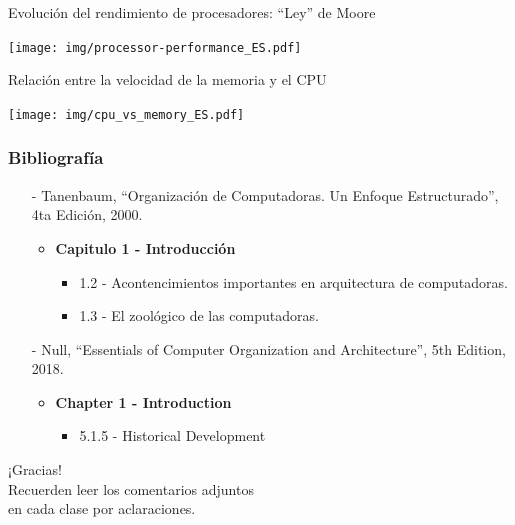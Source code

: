 \documentclass[aspectratio=169]{beamer}
\begin{document}
\begin{frame}[fragile,t]{Evolución del rendimiento de procesadores: ``Ley'' de Moore}
    \begin{center}
    \texttt{[image: img/processor-performance\_ES.pdf]}
    \end{center}
\end{frame}

\begin{frame}[fragile,t]{Relación entre la velocidad de la memoria y el CPU}
    \begin{center}
    \texttt{[image: img/cpu\_vs\_memory\_ES.pdf]}
    \end{center}
\end{frame}

\begin{frame}[fragile]
    \frametitle{Bibliografía}
    \begin{itemize}
     \setlength\itemsep{0.5cm}
    \item[-] \small Tanenbaum, “Organización de Computadoras. Un Enfoque Estructurado”, 4ta Edición, 2000.\\
    \begin{itemize}
     \item \textbf{Capitulo 1 - Introducción}\\
     \begin{itemize}
      \item 1.2 - Acontencimientos importantes en arquitectura de computadoras.
      \item 1.3 - El zoológico de las computadoras.
     \end{itemize}
    \end{itemize}
    \item[-] \small Null, “Essentials of Computer Organization and Architecture”, 5th Edition, 2018.\\
    \begin{itemize}
    \item \textbf{Chapter 1 - Introduction}
     \begin{itemize}
        \item 5.1.5 - Historical Development
     \end{itemize}
    \end{itemize}
    \end{itemize}
\end{frame}

\begin{frame}[plain]
    \begin{center}
    \vspace{2cm}
    \huge ¡Gracias!\\
    \vspace{2cm}
    \normalsize Recuerden leer los comentarios adjuntos\\ en cada clase por aclaraciones.
    \end{center}
\end{frame}
\end{document}
